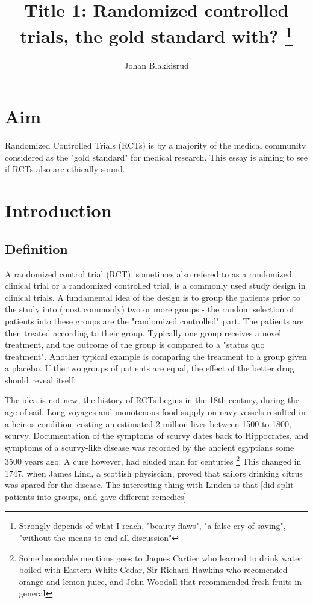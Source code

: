 \documentclass[12p]{article}
\title{Title 1: Randomized controlled trials, the gold standard with?
  \footnote{Strongly depends of what I reach, "beauty flaws", "a false cry of saving", "without the means to end all discussion"}
}
\author{Johan Blakkisrud}
\begin{document}
\maketitle

\section*{Aim}

Randomized Controlled Trials (RCTs) is by a majority of the medical community considered as the "gold standard" for medical research.
This essay is aiming to see if RCTs also are ethically sound.

\section*{Introduction}

\subsection*{Definition}

A randomized control trial (RCT), sometimes also refered to as a randomized clinical trial or a randomized controlled trial, is a commonly used study design in clinical trials.
A fundamental idea of the design is to group the patients prior to the study into (most commonly) two or more groups - the random selection of patients into these groups are the "randomized controlled" part.
The patients are then treated according to their group.
Typically one group receives a novel treatment, and the outcome of the group is compared to a "status quo treatment".
Another typical example is comparing the treatment to a group given a placebo. 
If the two groups of patients are equal, the effect of the better drug should reveal itself.

The idea is not new, the history of RCTs begins in the 18th century, during the age of sail.
Long voyages and monotenous food-supply on navy vessels resulted in a heinos condition, costing an estimated 2 million lives between 1500 to 1800, scurvy.
Documentation of the symptoms of scurvy dates back to Hippocrates, and symptoms of a scurvy-like disease was recorded by the ancient egyptians some 3500 years ago.
A cure however, had eluded man for centuries \footnote{Some honorable mentions goes to Jaques Cartier who learned to drink water boiled with Eastern White Cedar, Sir Richard Hawkins who recomended orange and lemon juice, and John Woodall that recommended fresh fruits in general}
This changed in 1747, when James Lind, a scottish physiscian, proved that sailors drinking citrus was spared for the disease.
The interesting thing with Linden is that [did split patients into groups, and gave different remedies]
\end{document}
